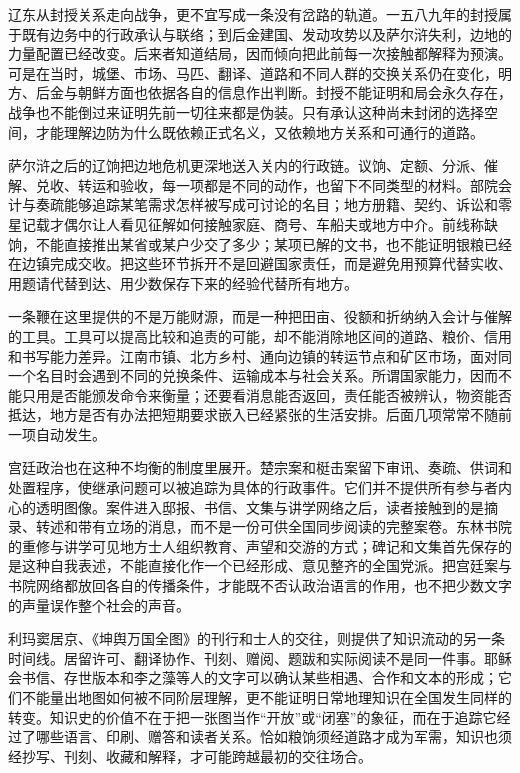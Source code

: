 辽东从封授关系走向战争，更不宜写成一条没有岔路的轨道。一五八九年的封授属于既有边务中的行政承认与联络；到后金建国、发动攻势以及萨尔浒失利，边地的力量配置已经改变。后来者知道结局，因而倾向把此前每一次接触都解释为预演。可是在当时，城堡、市场、马匹、翻译、道路和不同人群的交换关系仍在变化，明方、后金与朝鲜方面也依据各自的信息作出判断。封授不能证明和局会永久存在，战争也不能倒过来证明先前一切往来都是伪装。只有承认这种尚未封闭的选择空间，才能理解边防为什么既依赖正式名义，又依赖地方关系和可通行的道路。

萨尔浒之后的辽饷把边地危机更深地送入关内的行政链。议饷、定额、分派、催解、兑收、转运和验收，每一项都是不同的动作，也留下不同类型的材料。部院会计与奏疏能够追踪某笔需求怎样被写成可讨论的名目；地方册籍、契约、诉讼和零星记载才偶尔让人看见征解如何接触家庭、商号、车船夫或地方中介。前线称缺饷，不能直接推出某省或某户少交了多少；某项已解的文书，也不能证明银粮已经在边镇完成交收。把这些环节拆开不是回避国家责任，而是避免用预算代替实收、用题请代替到达、用少数保存下来的经验代替所有地方。

一条鞭在这里提供的不是万能财源，而是一种把田亩、役额和折纳纳入会计与催解的工具。工具可以提高比较和追责的可能，却不能消除地区间的道路、粮价、信用和书写能力差异。江南市镇、北方乡村、通向边镇的转运节点和矿区市场，面对同一个名目时会遇到不同的兑换条件、运输成本与社会关系。所谓国家能力，因而不能只用是否能颁发命令来衡量；还要看消息能否返回，责任能否被辨认，物资能否抵达，地方是否有办法把短期要求嵌入已经紧张的生活安排。后面几项常常不随前一项自动发生。

宫廷政治也在这种不均衡的制度里展开。楚宗案和梃击案留下审讯、奏疏、供词和处置程序，使继承问题可以被追踪为具体的行政事件。它们并不提供所有参与者内心的透明图像。案件进入邸报、书信、文集与讲学网络之后，读者接触到的是摘录、转述和带有立场的消息，而不是一份可供全国同步阅读的完整案卷。东林书院的重修与讲学可见地方士人组织教育、声望和交游的方式；碑记和文集首先保存的是这种自我表述，不能直接化作一个已经形成、意见整齐的全国党派。把宫廷案与书院网络都放回各自的传播条件，才能既不否认政治语言的作用，也不把少数文字的声量误作整个社会的声音。

利玛窦居京、《坤舆万国全图》的刊行和士人的交往，则提供了知识流动的另一条时间线。居留许可、翻译协作、刊刻、赠阅、题跋和实际阅读不是同一件事。耶稣会书信、存世版本和李之藻等人的文字可以确认某些相遇、合作和文本的形成；它们不能量出地图如何被不同阶层理解，更不能证明日常地理知识在全国发生同样的转变。知识史的价值不在于把一张图当作“开放”或“闭塞”的象征，而在于追踪它经过了哪些语言、印刷、赠答和读者关系。恰如粮饷须经道路才成为军需，知识也须经抄写、刊刻、收藏和解释，才可能跨越最初的交往场合。

